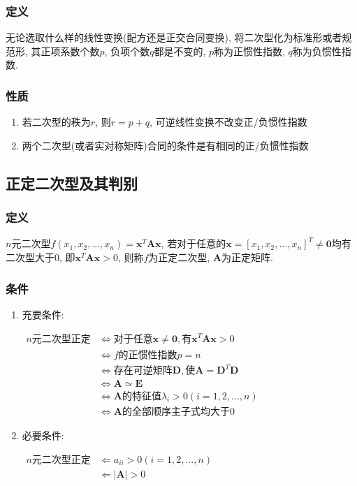 \subsubsection{定义}
无论选取什么样的线性变换(配方还是正交合同变换), 将二次型化为标准形或者规范形, 其正项系数个数$ p $, 负项个数$ q $都是不变的, $ p $称为正惯性指数, $ q $称为负惯性指数.
\subsubsection{性质}
\begin{enumerate}
	\item 若二次型的秩为$ r $, 则$ r=p+q $, 可逆线性变换不改变正/负惯性指数
	\item 两个二次型(或者实对称矩阵)合同的条件是有相同的正/负惯性指数
\end{enumerate}
\subsection{正定二次型及其判别}
\subsubsection{定义}
$ n $元二次型$ f(x_{1}, x_{2},... ,x_{n})=\bm{x}^{T}\bm{A}\bm{x} $, 若对于任意的$ \bm{x}=[x_{1},x_{2},... ,x_{n}]^{T}\neq \bm{0} $均有二次型大于0, 即$ \bm{x}^{T}\bm{A}\bm{x}>0 $, 则称$ f $为正定二次型, $ \bm{A} $为正定矩阵.
\subsubsection{条件}
\begin{enumerate}
	\item 充要条件: \par $ \begin{aligned}
		n\text{元二次型正定} & \Leftrightarrow \text{对于任意}\bm{x}\neq \bm{0}, \text{有}\bm{x}^{T}\bm{A}\bm{x}>0 \\
		& \Leftrightarrow f\text{的正惯性指数} p=n \\
		& \Leftrightarrow \text{存在可逆矩阵} \bm{D}, \text{使} \bm{A}=\bm{D}^{T}\bm{D} \\
		& \Leftrightarrow \bm{A}\simeq \bm{E} \\
		& \Leftrightarrow \bm{A}\text{的特征值} \lambda_{i}>0(i=1, 2,... ,n) \\
		& \Leftrightarrow \bm{A}\text{的全部顺序主子式均大于0}
	\end{aligned} $
	\item 必要条件: \par $ \begin{aligned}
		n\text{元二次型正定} & \Leftarrow a_{ii}>0(i=1, 2,... ,n) \\
		& \Leftarrow \left|\bm{A}\right|>0 
	\end{aligned} $
\end{enumerate}
